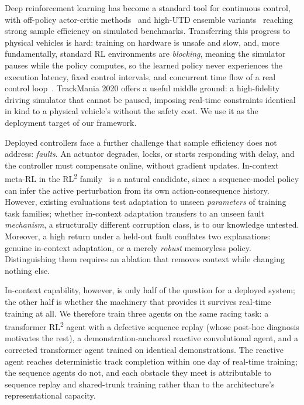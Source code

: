 \documentclass[conference]{IEEEtran}
\newcommand{\rltwo}{RL\textsuperscript{2}}
\begin{document}
\label{sec:introduction}



Deep reinforcement learning has become a standard tool for continuous control, with off-policy actor-critic methods~\cite{ddpg,td3,sac} and high-UTD ensemble variants~\cite{redq,droq,crossq} reaching strong sample efficiency on simulated benchmarks. Transferring this progress to physical vehicles is hard: training on hardware is unsafe and slow, and, more fundamentally, standard RL environments are \emph{blocking}, meaning the simulator pauses while the policy computes, so the learned policy never experiences the execution latency, fixed control intervals, and concurrent time flow of a real control loop~\cite{rtrl,delayedmdp}. TrackMania 2020 offers a useful middle ground: a high-fidelity driving simulator that cannot be paused, imposing real-time constraints identical in kind to a physical vehicle's without the safety cost. We use it as the deployment target of our framework.



Deployed controllers face a further challenge that sample efficiency does not address: \emph{faults}. An actuator degrades, locks, or starts responding with delay, and the controller must compensate online, without gradient updates. In-context meta-RL in the \rltwo{} family~\cite{rl2,wang2016learning,amago} is a natural candidate, since a sequence-model policy can infer the active perturbation from its own action-consequence history. However, existing evaluations test adaptation to unseen \emph{parameters} of training task families; whether in-context adaptation transfers to an unseen fault \emph{mechanism}, a structurally different corruption class, is to our knowledge untested. Moreover, a high return under a held-out fault conflates two explanations: genuine in-context adaptation, or a merely \emph{robust} memoryless policy. Distinguishing them requires an ablation that removes context while changing nothing else.



In-context capability, however, is only half of the question for a deployed system; the other half is whether the machinery that provides it survives real-time training at all. We therefore train three agents on the same racing task: a transformer \rltwo{} agent with a defective sequence replay (whose post-hoc diagnosis motivates the rest), a demonstration-anchored reactive convolutional agent, and a corrected transformer agent trained on identical demonstrations. The reactive agent reaches deterministic track completion within one day of real-time training; the sequence agents do not, and each obstacle they meet is attributable to sequence replay and shared-trunk training rather than to the architecture's representational capacity.
\end{document}
